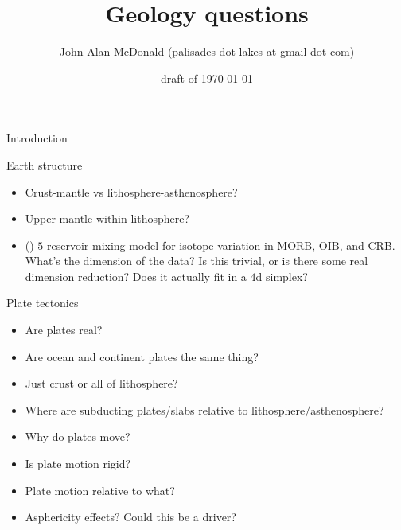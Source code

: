 \documentclass[12pt]{PalisadesLakesBook}
\title{Geology questions}
\author{John Alan McDonald 
(palisades dot lakes at gmail dot com)}
\date{draft of \today}
\begin{document}
\maketitle
{}
\begin{plSection}{Introduction}
\end{plSection}%
\begin{plSection}{Earth structure}
  \begin{itemize}
    \item Crust-mantle vs lithosphere-asthenosphere?
    \item Upper mantle within lithosphere?
    \item ()
    $5$ reservoir mixing model for isotope variation in MORB, OIB, and  CRB.
    What's the dimension of the data?
    Is this trivial, or is there some real dimension reduction?
    Does it actually fit in a $4$d simplex?
  \end{itemize}
\end{plSection}%
\begin{plSection}{Plate tectonics}
  \begin{itemize}
    \item Are plates real?
    \item Are ocean and continent plates the same thing?
    \item Just crust or all of lithosphere?
    \item Where are subducting plates/slabs relative to lithosphere/asthenosphere?
    \item Why do plates move?
    \item Is plate motion rigid?
    \item Plate motion relative to what?
    \item Asphericity effects? Could this be a driver?
  \end{itemize}
\end{plSection}%
\end{document}
